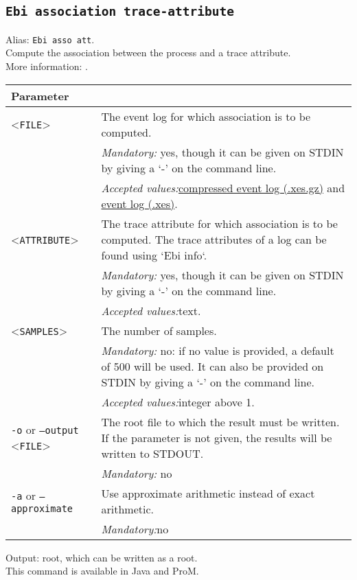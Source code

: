 {\subsection{\texttt{Ebi association trace-attribute}}
\label{command:Ebi association trace-attribute}
Alias: \texttt{Ebi asso att}.\\
Compute the association between the process and a trace attribute.\\
More information: \cite{DBLP:journals/tkde/LeemansMPH23}.\\
\begin{tabularx}{\linewidth}{lX}
\toprule
Parameter \\\midrule
<\texttt{FILE}>&The event log for which association is to be computed.\\
&\textit{Mandatory:} \quad yes, though it can be given on STDIN by giving a `-' on the command line.\\
&\textit{Accepted values:}\quad \hyperref[filehandler:compressed event log]{compressed event log (.xes.gz)} and \hyperref[filehandler:event log]{event log (.xes)}.\\
<\texttt{ATTRIBUTE}>&The trace attribute for which association is to be computed. The trace attributes of a log can be found using `Ebi info`.\\
&\textit{Mandatory:} \quad yes, though it can be given on STDIN by giving a `-' on the command line.\\
&\textit{Accepted values:}\quad text.\\
<\texttt{SAMPLES}>&The number of samples.\\
&\textit{Mandatory:} \quad no: if no value is provided, a default of 500 will be used. It can also be provided on STDIN by giving a `-' on the command line.\\
&\textit{Accepted values:}\quad integer above 1.\\
\texttt{-o} or \texttt{--output} <\texttt{FILE}> &
The root file to which the result must be written. If the parameter is not given, the results will be written to STDOUT.\\
&\textit{Mandatory:} \quad no\\
\texttt{-a} or \texttt{--approximate} & Use approximate arithmetic instead of exact arithmetic.\\
&\textit{Mandatory:}\quad no\\
\bottomrule
\end{tabularx}
\noindent Output: root, which can be written as a root.
\\This command is available in Java and ProM.
}
